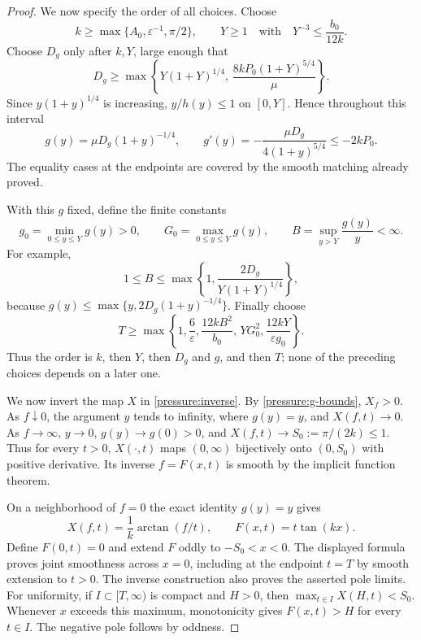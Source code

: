 \documentclass[11pt]{article}
\numberwithin{equation}{section}
\theoremstyle{definition}
\theoremstyle{remark}
\begin{document}
\begin{proof}
We now specify the order of all choices.  Choose
\begin{equation}\label{pressure:k-Y}
 k\ge\max\{A_0,\varepsilon^{-1},\pi/2\},\qquad
 Y\ge1\quad\text{with}\quad Y^{-3}\le\frac{b_0}{12k}.
\end{equation}
Choose $D_g$ only after $k,Y$, large enough that
\begin{equation}\label{pressure:D-choice}
 D_g\ge\max\left\{
 Y(1+Y)^{1/4},\,
 \frac{8kP_0(1+Y)^{5/4}}{\mu}
 \right\}.
\end{equation}
Since $y(1+y)^{1/4}$ is increasing, $y/h(y)\le1$ on $[0,Y]$.
Hence throughout this interval
\begin{equation}\label{pressure:decreasing-range}
 g(y)=\mu D_g(1+y)^{-1/4},\qquad
 g'(y)=-\frac{\mu D_g}{4(1+y)^{5/4}}\le-2kP_0.
\end{equation}
The equality cases at the endpoints are covered by the smooth matching
already proved.

With this $g$ fixed, define the finite constants
\[
 g_0=\min_{0\le y\le Y}g(y)>0,\qquad
 G_0=\max_{0\le y\le Y}g(y),\qquad
 B=\sup_{y>Y}\frac{g(y)}y<\infty.
\]
For example,
\[
 1\le B\le\max\left\{1,\frac{2D_g}{Y(1+Y)^{1/4}}\right\},
\]
because $g(y)\le\max\{y,2D_g(1+y)^{-1/4}\}$.
Finally choose
\begin{equation}\label{pressure:T-choice}
 T\ge\max\left\{
 1,\frac6\varepsilon,\frac{12kB^2}{b_0},\,
 YG_0^2,\frac{12kY}{\varepsilon g_0}
 \right\}.
\end{equation}
Thus the order is $k$, then $Y$, then $D_g$ and $g$, and then $T$;
none of the preceding choices depends on a later one.

We now invert the map $X$ in \cref{pressure:inverse}.
By \cref{pressure:g-bounds}, $X_f>0$.  As $f\downarrow0$, the argument
$y$ tends to infinity, where $g(y)=y$, and $X(f,t)\to0$.  As
$f\to\infty$, $y\to0$, $g(y)\to g(0)>0$, and
$X(f,t)\to S_0:=\pi/(2k)\le1$.  Thus for every $t>0$, $X(\cdot,t)$
maps $(0,\infty)$ bijectively onto $(0,S_0)$ with positive derivative.
Its inverse $f=F(x,t)$ is smooth by the implicit function theorem.

On a neighborhood of $f=0$ the exact identity $g(y)=y$ gives
\[
 X(f,t)=\frac1k\arctan(f/t),\qquad F(x,t)=t\tan(kx).
\]
Define $F(0,t)=0$ and extend $F$ oddly to $-S_0<x<0$.  The displayed
formula proves joint smoothness across $x=0$, including at the endpoint
$t=T$ by smooth extension to $t>0$.  The inverse construction also
proves the asserted pole limits.  For uniformity, if $I\subset[T,\infty)$
is compact and $H>0$, then $\max_{t\in I}X(H,t)<S_0$.  Whenever $x$
exceeds this maximum, monotonicity gives $F(x,t)>H$ for every $t\in I$.
The negative pole follows by oddness.


\end{proof}
\end{document}
